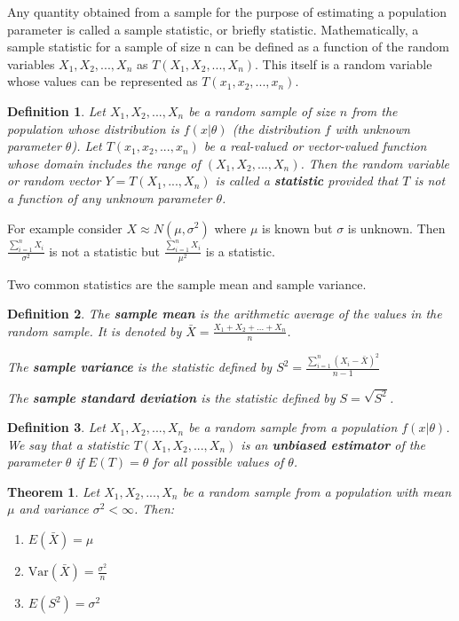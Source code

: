 \documentclass[12pt,twoside]{report}
\newtheorem{defn}{Definition}
\newtheorem{thm}{Theorem}
\begin{document}
Any quantity obtained from a sample for the purpose of estimating a population parameter is called a sample
statistic, or briefly statistic. Mathematically, a sample statistic for a sample of size n can be defined as a function of the random variables $X_1, X_2, ..., X_n$ as $T(X_1, X_2, ..., X_n)$. This itself is a random variable whose values can be represented as $T(x_1, x_2, ..., x_n)$.

\begin{defn}
    Let $X_1, X_2, ..., X_n$ be a random sample of size $n$ from the population whose distribution is $f\left (x|\theta\right )$ (the distribution $f$ with unknown parameter $\theta$). Let $T\left (x_1, x_2, ...,x_n\right )$ be a real-valued or vector-valued function whose domain includes the range of $\left (X_1, X_2, ..., X_n\right )$. Then the random variable or random vector $Y = T\left (X_1, ..., X_n\right )$ is called a \textbf{statistic} provided that $T$ is not a function of any unknown parameter $\theta$.
\end{defn}

For example consider $X \approx N(\mu, \sigma^2)$ where $\mu$ is known but $\sigma$ is unknown. Then $\frac{\sum_{i=1}^n X_i}{\sigma^2}$ is not a statistic but $\frac{\sum_{i=1}^n X_i}{\mu^2}$ is a statistic.

Two common statistics are the sample mean and sample variance.

\begin{defn}
    The \textbf{sample mean} is the arithmetic average of the values in the random sample. It is denoted by $\bar{X} = \displaystyle \frac{X_1 + X_2 + ... + X_n}{n}$.

    The \textbf{sample variance} is the statistic defined by $S^2 = \displaystyle \frac{\sum_{i=1}^n \left (X_i - \bar{X}\right )^2}{n-1}$

    The \textbf{sample standard deviation} is the statistic defined by $S = \sqrt{S^2}$.
\end{defn}

\begin{defn}
    Let $X_1, X_2, ..., X_n$ be a random sample from a population $f\left (x| \theta\right )$. We say that a statistic $T\left (X_1, X_2, ...,X_n\right )$ is an \textbf{unbiased estimator} of the parameter $\theta$ if $E(T) = \theta$ for all possible values of $\theta$.
\end{defn}

\begin{thm}
    Let $X_1, X_2, ..., X_n$ be a random sample from a population with mean $\mu $ and variance $\sigma ^2 < \infty$. Then:
    \begin{enumerate}
        \item $E\left (\bar{X}\right ) = \mu $
        \item $\text{Var}\left (\bar{X}\right ) = \frac{\sigma ^2}{n}$
        \item $E\left (S ^2\right ) = \sigma ^2$
    \end{enumerate}
\end{thm}
\end{document}
